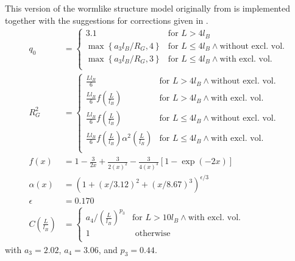 This version of the wormlike structure model originally from \cite{Pedersen96Macrom} is implemented together with the suggestions for corrections given in \cite{Chen2006}.
\begin{align}
q_0 &=
\begin{cases}
3.1 & \mbox{for~} L>4l_B \\
\max\left\{a_3 l_B/R_G,4\right\} & \mbox{for~} L\leq 4l_B \wedge \mbox{without excl. vol.}\\
\max\left\{a_3 l_B/R_G,3\right\} & \mbox{for~} L\leq 4l_B \wedge \mbox{with excl. vol.}\\
\end{cases}\\
R_G^2 &=
\begin{cases}
\frac{Ll_B}{6} & \mbox{for~} L > 4l_B \wedge \mbox{without excl. vol.} \\
\frac{Ll_B}{6} f\left(\frac{L}{l_B}\right) & \mbox{for~} L > 4l_B \wedge \mbox{with excl. vol.} \\
\frac{Ll_B}{6} f\left(\frac{L}{l_B}\right)& \mbox{for~} L\leq 4l_B \wedge \mbox{without excl. vol.}\\
\frac{Ll_B}{6} f\left(\frac{L}{l_B}\right)\alpha^2\left(\frac{L}{l_B}\right) & \mbox{for~} L\leq 4l_B \wedge \mbox{with excl. vol.}\\
\end{cases} \\
f(x) &= 1-\frac{3}{2x}+\frac{3}{2\left(x\right)^2}-\frac{3}{4\left(x\right)^3}\left[1-\exp\left(-2x\right)\right]\\
\alpha(x) &= \left(1+(x/3.12)^2+(x/8.67)^3\right)^{\epsilon/3} \\
\epsilon&=0.170 \\
C\left(\frac{L}{l_B}\right) &=
\begin{cases}
a_4/\left(\frac{L}{l_B}\right)^{p_3} & \mbox{for~} L > 10l_B \wedge \mbox{with excl. vol.} \\
1 & \mbox{ otherwise}\\
\end{cases}
\end{align}
with  $a_3=2.02$, $a_4=3.06$, and $p_3=0.44$.
